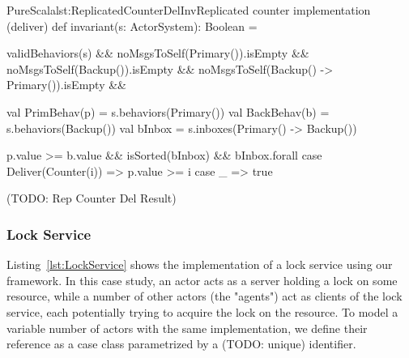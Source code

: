 \documentclass[a4paper,twoside]{article}
\newcommand{\TODO}[1]{\textcolor{YellowOrange}{(TODO: #1)}} %
\newcommand{\RefCode}[1]{Listing~\ref{#1}}
\begin{document}
\begin{Code}{PureScala}{lst:ReplicatedCounterDelInv}{Replicated counter implementation (deliver)}
def invariant(s: ActorSystem): Boolean = {
  validBehaviors(s)                           &&
  noMsgsToSelf(Primary()).isEmpty             &&
  noMsgsToSelf(Backup()).isEmpty              &&
  noMsgsToSelf(Backup() -> Primary()).isEmpty && {
    val PrimBehav(p) = s.behaviors(Primary())
    val BackBehav(b) = s.behaviors(Backup())
    val bInbox       = s.inboxes(Primary() -> Backup())

    p.value >= b.value && isSorted(bInbox) && bInbox.forall {
      case Deliver(Counter(i)) => p.value >= i
      case _                   => true
    }
  }
}
\end{Code}

\TODO{Rep Counter Del Result}

\subsubsection{Lock Service}

\RefCode{lst:LockService} shows the implementation of a lock service using our framework. In this case study, an actor acts as a server holding a lock on some resource, while a number of other actors (the "agents") act as clients of the lock service, each potentially trying to acquire the lock on the resource. To model a variable number of actors with the same implementation, we define their reference as a case class parametrized by a \TODO{unique} identifier.
\end{document}
